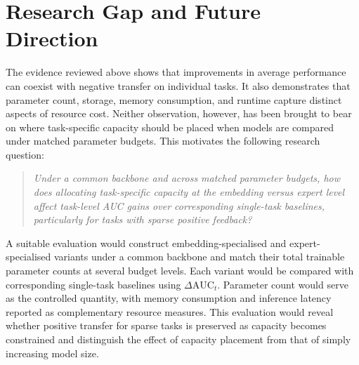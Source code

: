 \section{Research Gap and Future Direction}
The evidence reviewed above shows that improvements in average performance can coexist
with negative transfer on individual tasks. It also demonstrates that parameter count,
storage, memory consumption, and runtime capture distinct aspects of resource cost.
Neither observation, however, has been brought to bear on where task-specific capacity should be placed when models are compared under matched parameter budgets. This motivates the following research question:

\begin{quote}
\begin{minipage}{\linewidth}\itshape
\textit{Under a common backbone and across matched parameter budgets, how does allocating task-specific capacity at the embedding versus expert level affect task-level AUC gains over corresponding single-task baselines, particularly for tasks with sparse positive feedback?}
\end{minipage}
\end{quote}

A suitable evaluation would construct embedding-specialised and expert-specialised variants under a common backbone and match their total trainable parameter counts at several budget levels. Each variant would be compared with corresponding single-task baselines using $\Delta\mathrm{AUC}_t$. Parameter count would serve as the controlled quantity, with memory consumption and inference latency reported as complementary resource measures. This evaluation would reveal whether positive transfer for sparse tasks is preserved as capacity becomes constrained and distinguish the effect of capacity placement from that of simply increasing model size.
